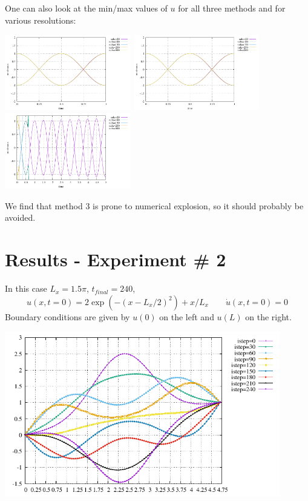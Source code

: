 One can also look at the min/max values of $u$ for all three methods and 
for various resolutions:
\begin{center}
\includegraphics[width=5.5cm]{python_codes/fieldstone_164/results1/stats_meth1.pdf}
\includegraphics[width=5.5cm]{python_codes/fieldstone_164/results1/stats_meth2.pdf}
\includegraphics[width=5.5cm]{python_codes/fieldstone_164/results1/stats_meth3.pdf}
\end{center}
We find that method 3 is prone to numerical explosion, so
it should probably be avoided.

\section*{Results - Experiment \# 2}

In this case $L_x=1.5\pi$, $t_{final}=240$, 
\[
u(x,t=0)=2 \exp\left(-(x-L_x/2)^2 \right)+x/L_x
\qquad
\dot{u}(x,t=0)=0 
\]
Boundary conditions are given by $u(0)$ on the left and $u(L)$ on the right.

\begin{center}
\includegraphics[width=12cm]{python_codes/fieldstone_164/results2/u.pdf}
\end{center}




